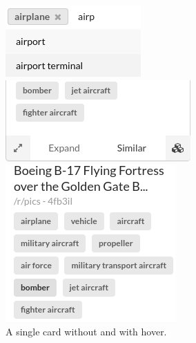 \documentclass[msc,oneside]{ubcthesis}%
\begin{document}
\begin{figure}[H]
\begin{multicols}{3}
    \includegraphics[width=\linewidth]{dropdown_search.png}\par
    \includegraphics[width=\linewidth]{similar.png}\par
    \includegraphics[width=\linewidth]{labelclick.png}\par
\end{multicols}
\caption{A single card without and with hover.}
\end{figure}
\end{document}
